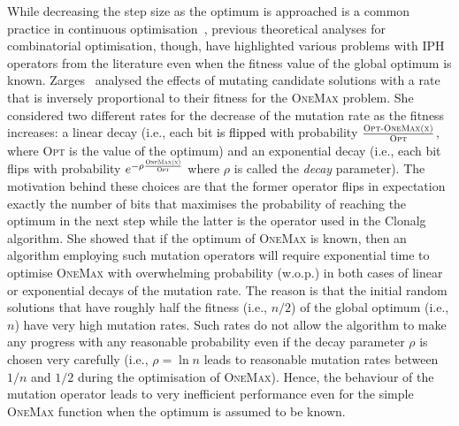 \documentclass[lettersize,journal]{IEEEtran}
\newcommand{\new}[1]{\textcolor{black}{#1}}
\newcommand{\rev}[1]{\textcolor{black}{#1}}
\begin{document}
While decreasing the step size as the optimum is approached is \rev{a} common practice in continuous optimisation~\cite{AugerDoerrBook}, previous theoretical analyses for combinatorial optimisation, though, have highlighted various problems with IPH operators from the literature even when the fitness value of the global optimum is known.
Zarges~ \cite{Zarges2008} analysed the effects of mutating candidate solutions with a rate that is inversely proportional to their fitness for the \textsc{OneMax} problem.
She considered two different rates for the decrease of the mutation rate as the fitness increases: a linear decay (i.e., each bit \new{is flipped} with probability $\frac{\textsc{{\color{black}\text{Opt}-}OneMax(x)}}{\textsc{Opt}}$, where \textsc{Opt} is the value of the optimum) 
and an exponential decay (i.e., each bit flips with probability $e^{- \rho \frac{\textsc{OneMax(x)}}{\textsc{Opt}}}$ where $\rho$ is called the {\it decay} parameter).
The motivation behind these choices are that the former operator flips in expectation exactly the number of bits that maximises the probability of reaching the optimum in the next step while the latter is the
operator used in the Clonalg algorithm.  
She showed that if the optimum of \textsc{OneMax} is known, then an algorithm employing such mutation operator\new{s} will require exponential time to optimise \textsc{OneMax} with overwhelming probability (w.o.p.)
in both cases of linear or exponential decays of the mutation rate.
The reason is that the initial random solutions that have roughly half the fitness (i.e., $n/2$) of the global optimum (i.e., $n$) have very high mutation rates. Such rates do not allow the algorithm to make any progress with any reasonable probability even if the decay parameter $\rho$ is chosen very carefully (i.e., $\rho = \ln n$ leads to reasonable mutation rates between $1/n$ and $1/2$ during the optimisation of \textsc{OneMax}).
Hence, the behaviour of the mutation operator leads to very inefficient performance even for the simple \textsc{OneMax} function when the optimum is assumed to be known. 
\end{document}
